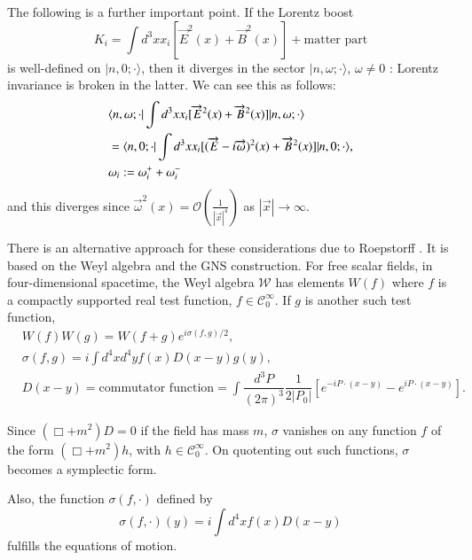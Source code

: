 The following is a further important point. If the Lorentz boost
\begin{equation}
K_{i}=\int d^{3}xx_{i}[\overrightarrow{E}^{2}(x)+\overrightarrow{B}^{2}(x)]+\text{matter part}\label{chap4-eq2.11}
\end{equation}
is well-defined on $|n, 0;\cdot\rangle$, then it diverges in the sector $|n,\omega;\cdot \rangle$, $\omega\neq 0$ : Lorentz invariance is broken in the latter. We can see this as follows:
\begin{align}
& \langle n,\omega;\cdot | \int d^{3}xx_{i}[\overrightarrow{E}^{2}(x)+\overrightarrow{B}^{2}(x)]|n,\omega;\cdot\rangle\notag\\
& =\langle n,0;\cdot |\int d^{3}xx_{i}[(\overrightarrow{E}-i\overrightarrow{\omega})^{2}(x)+\overrightarrow{B}^{2}(x)]|n,0;\cdot\rangle,\notag\\
&\omega_{i} := \omega^{+}_{i}+\omega^{-}_{i}\label{chap4-eq2.12}
\end{align}
and this diverges since $\overrightarrow{\omega}^{2}(x)=\mathcal{O}(\frac{1}{|\overrightarrow{x}|^{4}})$ as $|\overrightarrow{x}|\to \infty$.

There is an alternative approach for these considerations due to Roepstorff \cite{chap4-key6}. It is based on the Weyl algebra and the GNS construction. For free scalar fields, in four-dimensional spacetime, the Weyl algebra $\mathcal{W}$ has elements $W(f)$ where $f$ is a compactly supported real test function, $f\in \mathcal{C}^{\infty}_{0}$. If $g$ is another such test function,
\begin{align}
& W(f)W(g)=W(f+g)e^{i\sigma(f,g)/2},\label{chap4-eq2.13}\\
& \sigma (f,g)=i \int d^{4}xd^{4}yf(x)D(x-y)g(y),\label{chap4-eq2.14}\\
& D(x-y)=\text{commutator function} = \int \dfrac{d^{3}P}{(2\pi)^{3}}\dfrac{1}{2|P_{0}|}[e^{-iP\cdot (x-y)}-e^{iP\cdot (x-y)}].\label{chap4-eq2.15}
\end{align}

Since $(\Box + m^2)D = 0$ if the field has mass $m$, $\sigma$ vanishes on any function $f$ of the form $(\Box + m^2)h$, with $h\in \mathcal{C}^{\infty}_{0}$. On quotenting out such functions, $\sigma$ becomes a symplectic form.

Also, the function $\sigma (f,\cdot)$ defined by
\begin{equation}
\sigma(f,\cdot)(y)=i\int d^{4}xf(x)D(x-y)\label{chap4-eq2.16}
\end{equation}
fulfills the equations of motion.

